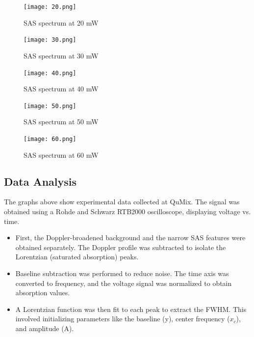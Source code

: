 \documentclass[a4paper, 12pt]{article}
\begin{document}
\begin{figure}[!htbp]
    \centering
    \texttt{[image: 20.png]}
    \caption{SAS spectrum at 20 mW}
    \label{fig:20_mW_Spectrum}
\end{figure}

\vspace{1em}

\begin{figure}[!htbp]
    \centering
    \texttt{[image: 30.png]}
    \caption{SAS spectrum at 30 mW}
    \label{fig:30_mW_Spectrum}
\end{figure}

\clearpage  %

\begin{figure}[!htbp]
    \centering
    \texttt{[image: 40.png]}
    \caption{SAS spectrum at 40 mW}
    \label{fig:40 mW Spectrum}
\end{figure}

\vspace{1em}

\begin{figure}[!htbp]
    \centering
    \texttt{[image: 50.png]}
    \caption{SAS spectrum at 50 mW}
    \label{fig:50 mW Spectrum}
\end{figure}

\clearpage  %

\begin{figure}[!htbp]
    \centering
    \texttt{[image: 60.png]}
    \caption{SAS spectrum at 60 mW}
    \label{fig:60 mW Spectrum}
\end{figure}

\subsection{Data Analysis}
The graphs above show experimental data collected at QuMix. The signal was obtained using a Rohde and Schwarz RTB2000 oscilloscope, displaying voltage vs. time.

\begin{itemize}
    \item First, the Doppler-broadened background and the narrow SAS features were obtained separately. The Doppler profile was subtracted to isolate the Lorentzian (saturated absorption) peaks.
    \item Baseline subtraction was performed to reduce noise. The time axis was converted to frequency, and the voltage signal was normalized to obtain absorption values.
    \item A Lorentzian function was then fit to each peak to extract the FWHM. This involved initializing parameters like the baseline (y), center frequency ($x_c$), and amplitude (A).
\end{itemize}
\end{document}
